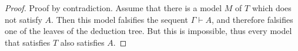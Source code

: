 

\setcounter{section}{3}
\setcounter{subsection}{2}
\setcounter{dfn}{17}

\begin{proof}
Proof by contradiction.
Assume that there is a model $M$ of $T$ which does not satisfy $A$.
Then this model falsifies the sequent $\Gamma \vdash A$, and therefore falsifies one of the leaves of the deduction tree.
But this is impossible, thus every model that satisfies $T$ also satisfies $A$.
\end{proof}



